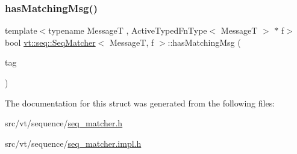 \subsubsection{\texorpdfstring{has\+Matching\+Msg()}{hasMatchingMsg()}}
{\footnotesize\ttfamily template$<$typename MessageT , Active\+Typed\+Fn\+Type$<$ Message\+T $>$ $\ast$ f$>$ \\
bool \hyperlink{structvt_1_1seq_1_1_seq_matcher}{vt\+::seq\+::\+Seq\+Matcher}$<$ MessageT, f $>$\+::has\+Matching\+Msg (\begin{DoxyParamCaption}\item[{\hyperlink{namespacevt_a84ab281dae04a52a4b243d6bf62d0e52}{Tag\+Type} const \&}]{tag }\end{DoxyParamCaption})\hspace{0.3cm}{\ttfamily [static]}}



The documentation for this struct was generated from the following files\+:\begin{DoxyCompactItemize}
\item 
src/vt/sequence/\hyperlink{seq__matcher_8h}{seq\+\_\+matcher.\+h}\item 
src/vt/sequence/\hyperlink{seq__matcher_8impl_8h}{seq\+\_\+matcher.\+impl.\+h}\end{DoxyCompactItemize}
